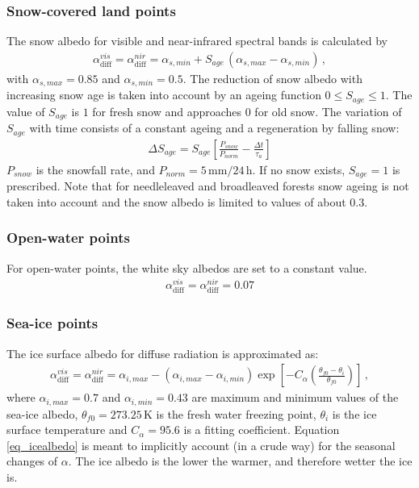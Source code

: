 \documentclass[a4paper,11pt]{article}
\begin{document}
\subsubsection{Snow-covered land points}
The snow albedo for visible and near-infrared spectral bands is calculated by
\begin{align}
 \alpha_{\mathrm{diff}}^{vis} = \alpha_{\mathrm{diff}}^{nir} =\alpha_{s,min} + S_{age}\,\left(\alpha_{s,max} - \alpha_{s,min}\right)\,,
\end{align}
with $\alpha_{s,max}=0.85$ and $\alpha_{s,min}=0.5$. The reduction of snow albedo with increasing snow age is taken into account by an ageing function $0\leq S_{age}\leq 1$. The value 
of $S_{age}$ is $1$ for fresh snow and approaches 0 for old snow. The variation of $S_{age}$ with time consists of a constant ageing and a regeneration by falling snow:
\begin{align}
 \Delta S_{age} = S_{age}\left[\frac{P_{snow}}{P_{norm}} - \frac{\Delta t}{\tau_{a}}\right]
\end{align}
$P_{snow}$ is the snowfall rate, and $P_{norm}=5\,\mathrm{mm}/24\,\mathrm{h}$. If no snow exists, $S_{age}=1$ is prescribed. Note that for needleleaved and broadleaved forests snow 
ageing is not taken into account and the snow albedo is limited to values of about $0.3$.


\subsubsection{Open-water points}
For open-water points, the white sky albedos are set to a constant value.
\begin{align}
  \alpha_{\mathrm{diff}}^{vis} = \alpha_{\mathrm{diff}}^{nir} = 0.07
\end{align}


\subsubsection{Sea-ice points}
The ice surface albedo for diffuse radiation is approximated as:
\begin{align}
  \alpha_{\mathrm{diff}}^{vis} = \alpha_{\mathrm{diff}}^{nir} = \alpha_{i,max} - 
  \left(\alpha_{i,max}-\alpha_{i,min}\right)\exp\left[-C_{\alpha}\left(\frac{\theta_{f0}-\theta_{i}}{\theta_{f0}}\right)\right]\,, \label{eq_icealbedo}
\end{align}
where $\alpha_{i,max}=0.7$ and $\alpha_{i,min}=0.43$ are maximum and minimum values of the sea-ice albedo, $\theta_{f0}=273.25\,\mathrm{K}$ is the fresh water freezing point, 
$\theta_{i}$ is the ice surface temperature and $C_{\alpha}=95.6$ is a fitting coefficient. Equation \ref{eq_icealbedo} is meant to implicitly account (in a crude way) for the seasonal 
changes of $\alpha$. The ice albedo is the lower the warmer, and therefore wetter the ice is.
\end{document}

